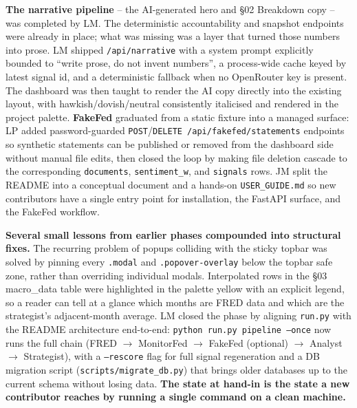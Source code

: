 \textbf{The narrative pipeline} -- the AI-generated hero and §02 Breakdown copy -- was completed by LM. The deterministic accountability and snapshot endpoints were already in place; what was missing was a layer that turned those numbers into prose. LM shipped \texttt{/api/narrative} with a system prompt explicitly bounded to ``write prose, do not invent numbers'', a process-wide cache keyed by latest signal id, and a deterministic fallback when no OpenRouter key is present. The dashboard was then taught to render the AI copy directly into the existing layout, with hawkish/dovish/neutral consistently italicised and rendered in the project palette. \textbf{FakeFed} graduated from a static fixture into a managed surface: LP added password-guarded \texttt{POST}/\texttt{DELETE /api/fakefed/statements} endpoints so synthetic statements can be published or removed from the dashboard side without manual file edits, then closed the loop by making file deletion cascade to the corresponding \texttt{documents}, \texttt{sentiment\_w}, and \texttt{signals} rows. JM split the README into a conceptual document and a hands-on \texttt{USER\_GUIDE.md} so new contributors have a single entry point for installation, the FastAPI surface, and the FakeFed workflow.

\textbf{Several small lessons from earlier phases compounded into structural fixes.} The recurring problem of popups colliding with the sticky topbar was solved by pinning every \texttt{.modal} and \texttt{.popover-overlay} below the topbar safe zone, rather than overriding individual modals. Interpolated rows in the §03 macro\_data table were highlighted in the palette yellow with an explicit legend, so a reader can tell at a glance which months are FRED data and which are the strategist's adjacent-month average. LM closed the phase by aligning \texttt{run.py} with the README architecture end-to-end: \texttt{python run.py pipeline --once} now runs the full chain (FRED $\rightarrow$ MonitorFed $\rightarrow$ FakeFed (optional) $\rightarrow$ Analyst $\rightarrow$ Strategist), with a \texttt{--rescore} flag for full signal regeneration and a DB migration script (\texttt{scripts/migrate\_db.py}) that brings older databases up to the current schema without losing data. \textbf{The state at hand-in is the state a new contributor reaches by running a single command on a clean machine.}